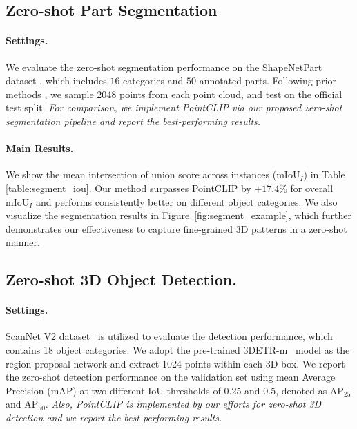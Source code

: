 \documentclass[10pt,twocolumn,letterpaper]{article}
\begin{document}
\subsection{Zero-shot Part Segmentation}

\paragraph{Settings.} 
We evaluate the zero-shot segmentation performance on the ShapeNetPart dataset \cite{yi2016scalable}, which includes $16$ categories and $50$ annotated parts. Following prior methods \cite{qi2017pointnet++,wang2019dynamic,ma2022rethinking}, we sample 2048 points from each point cloud, and test on the official test split. \textit{For comparison, we implement PointCLIP via our proposed zero-shot segmentation pipeline and report the best-performing results.} 

\vspace{-0.1cm}
\paragraph{Main Results.}
We show the mean intersection of union score across instances (mIoU$_I$) in Table \ref{table:segment_iou}. Our method surpasses PointCLIP by $+17.4\%$ for overall mIoU$_I$ and performs consistently better on different object categories. We also visualize the segmentation results in Figure~\ref{fig:segment_example}, which further demonstrates our effectiveness to capture fine-grained 3D patterns in a zero-shot manner.

\subsection{Zero-shot 3D Object Detection.} 

\paragraph{Settings.}
ScanNet V2 dataset~\cite{dai2017scannet} is utilized to evaluate the detection performance, which contains 18 object categories. We adopt the pre-trained 3DETR-m~\cite{misra2021end} model as the region proposal network and extract 1024 points within each 3D box. We report the zero-shot detection performance on the validation set using mean Average Precision (mAP) at two different IoU thresholds of $0.25$ and $0.5$, denoted as AP$_{25}$ and AP$_{50}$. \textit{Also, PointCLIP is implemented by our efforts for zero-shot 3D detection and we report the best-performing results.}
\end{document}
